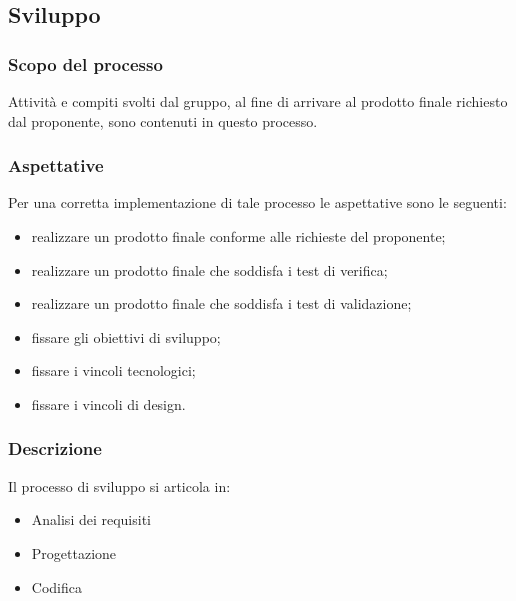 \begin{comment}
\textbf{(questa ultima sezione è da inserire nella fase successiva)}
\subsubsection{Collaudo e consegna del prodotto}
Al fine di consegnare il prodotto terminato il gruppo deve effettuare un collaudo in presenza del proponente e dei committenti. Precedentemente a questo test il gruppo deve assicurare correttezza, completezza e affidabilità per ogni parte del materiale consegnato, permettendo così che tutti i requisiti obbligatori siano soddisfatti e l'esecuzione dei test abbiano un esito positivo. In seguito al collaudo finale il responsabile di progetto consegna il prodotto su un supporto fisico.
\end{comment}
        
\subsection{Sviluppo}
\subsubsection{Scopo del processo}
Attività e compiti svolti dal gruppo, al fine di arrivare al prodotto finale richiesto dal proponente, sono contenuti in questo processo.
\subsubsection{Aspettative}
Per una corretta implementazione di tale processo le aspettative sono le seguenti:
\begin{itemize}
	\item realizzare un prodotto finale conforme alle richieste del proponente;
	\item realizzare un prodotto finale che soddisfa i test di verifica;
	\item realizzare un prodotto finale che soddisfa i test di validazione;
	\item fissare gli obiettivi di sviluppo;
	\item fissare i vincoli tecnologici;
	\item fissare i vincoli di design.
\end{itemize}
\subsubsection{Descrizione}
Il processo di sviluppo si articola in:
\begin{itemize}
	\item Analisi dei requisiti
	\item Progettazione
	\item Codifica	
\end{itemize}
